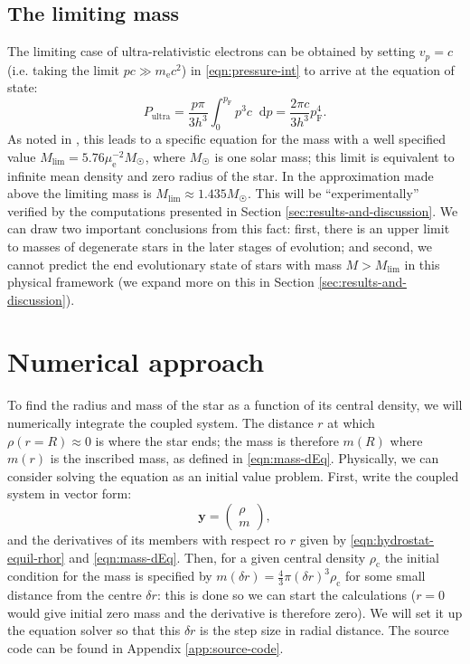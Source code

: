 \documentclass[]{article}
\newcommand{\dd}{\mathop{}\!\mathrm{d}}
\renewcommand{\vec}[1]{\boldsymbol{#1}}
\newcommand{\rhoCentre}{\rho_\mathrm{c}}
\newcommand{\fermiMtm}{p_\mathrm{F}}
\newcommand{\massElectron}{m_\mathrm{e}}
\begin{document}
\subsection{The limiting mass}
	The limiting case of ultra-relativistic electrons can be obtained by setting $v_p = c$ (i.e. taking the limit $pc \gg \massElectron c^2$) in \eqref{eqn:pressure-int} to arrive at the equation of state:
	\begin{equation}
		P_\mathrm{ultra} = \frac{p \pi}{3 h^3} \int_0^{\fermiMtm} p^3 c \dd p = \frac{2 \pi c}{3 h^3} \fermiMtm^4.
	\end{equation}
	As noted in \cite{Chandrasekhar1984}, this leads to a specific equation for the mass with a well specified value $M_\mathrm{lim} = 5.76 \mu_{\mathrm{e}}^{-2} M_{\astrosun}$, where $M_{\astrosun}$ is one solar mass; this limit is equivalent to infinite mean density and zero radius of the star. In the approximation made above the limiting mass is $M_\mathrm{lim} \approx 1.435 M_{\astrosun}$. This will be ``experimentally'' verified by the computations presented in Section \ref{sec:results-and-discussion}. We can draw two important conclusions from this fact: first, there is an upper limit to masses of degenerate stars in the later stages of evolution; and second, we cannot predict the end evolutionary state of stars with mass $ M > M_\mathrm{lim}$ in this physical framework (we expand more on this in Section \ref{sec:results-and-discussion}).

\section{Numerical approach}\label{sec:numerical-approach}
	To find the radius and mass of the star as a function of its central density, we will numerically integrate the coupled system. The distance $r$ at which $\rho (r=R) \approx 0$ is where the star ends; the mass is therefore $m(R)$ where $m(r)$ is the inscribed mass, as defined in \eqref{eqn:mass-dEq}. Physically, we can consider solving the equation as an initial value problem. First, write the coupled system in vector form:
	\begin{equation}
		\vec{y} = \begin{pmatrix}
			\rho \\
			m
		\end{pmatrix},
	\end{equation}
	and the derivatives of its members with respect ro $r$ given by \eqref{eqn:hydrostat-equil-rhor} and \eqref{eqn:mass-dEq}. Then, for a given central density $\rhoCentre$ the initial condition for the mass is specified by $m(\delta r) = \frac{4}{3} \pi (\delta r)^3 \rhoCentre$ for some small distance from the centre $\delta r$: this is done so we can start the calculations ($r=0$ would give initial zero mass and the derivative is therefore zero). We will set it up the equation solver so that this $\delta r$ is the step size in radial distance. The source code can be found in Appendix \ref{app:source-code}.
\end{document}

